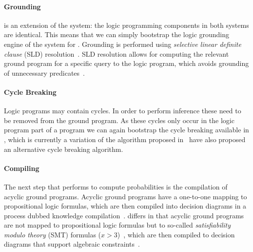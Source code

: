 
\paragraph{\bf Grounding}

\dcproblogsys is an extension of the \problogsys system: the logic programming components in both systems are identical. This means that we can simply bootstrap the logic grounding engine of the \problogsys system for \dcproblogsys. Grounding is performed using {\em selective linear definite clause} (SLD) resolution~\citep{kowalski1974predicate,sterling1994art}. SLD resolution allows for computing the relevant ground program for a specific query to the logic program, which avoids grounding of unnecessary predicates~\citep{kersting2000bayesian,fierens2015inference}.

\paragraph{\bf Cycle Breaking} Logic programs may contain cycles. In order to perform inference these need to be removed from the ground program. As these cycles only occur in the logic program part of a \dcproblogsty program we can again bootstrap the cycle breaking available in \problogsys, which is currently a variation of the algorithm proposed in~\citep{janhunen2004representing} \citet{mantadelis2010dedicated} have also proposed an alternative cycle breaking algorithm.

\paragraph{\bf Compiling} The next step that \problogsys performs to compute probabilities is the compilation of acyclic ground programs. Acyclic ground programs have a one-to-one mapping to propositional logic formulas, which are then compiled into decision diagrams in a process dubbed knowledge compilation~\citep{darwiche2002knowledge}. \dcproblogsys differs in that acyclic ground \dcplpsty programs are not mapped to propositional logic formulas but to so-called {\em satisfiability modulo theory} (SMT) formulas (\eg $x>3$)~\citep{barrett2009handbook}, which are then compiled to decision diagrams that support algebraic constraints~\citep{sanner2011symbolic,zuidbergdosmartires2019exact}.


